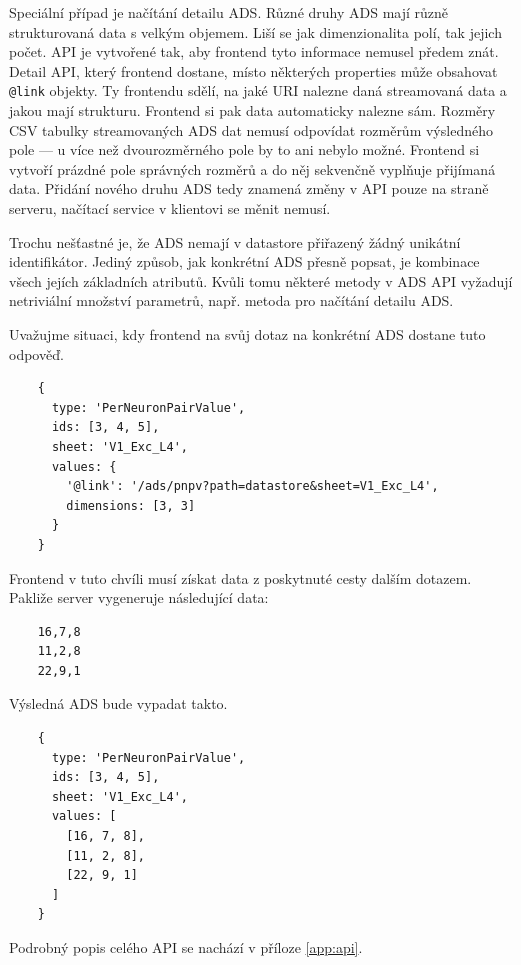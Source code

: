Speciální případ je načítání detailu ADS. Různé druhy ADS mají různě strukturovaná data s velkým objemem. Liší se jak dimenzionalita polí, tak jejich počet. API je vytvořené tak, aby frontend tyto informace nemusel předem znát. Detail API, který frontend dostane, místo některých properties může obsahovat \lstinline|@link| objekty. Ty frontendu sdělí, na jaké URI nalezne daná streamovaná data a jakou mají strukturu. Frontend si pak data automaticky nalezne sám. Rozměry CSV tabulky streamovaných ADS dat nemusí odpovídat rozměrům výsledného pole --- u více než dvourozměrného pole by to ani nebylo možné. Frontend si vytvoří prázdné pole správných rozměrů a do něj sekvenčně vyplňuje přijímaná data. Přidání nového druhu ADS tedy znamená změny v API pouze na straně serveru, načítací service v klientovi se měnit nemusí.

Trochu nešťastné je, že ADS nemají v datastore přiřazený žádný unikátní identifikátor. Jediný způsob, jak konkrétní ADS přesně popsat, je kombinace všech jejích základních atributů. Kvůli tomu některé metody v ADS API vyžadují netriviální množství parametrů, např. metoda pro načítání detailu ADS.

\begin{exmp}
  Uvažujme situaci, kdy frontend na svůj dotaz na konkrétní ADS dostane tuto odpověď.
  
  \begin{lstlisting}
    {
      type: 'PerNeuronPairValue',
      ids: [3, 4, 5],
      sheet: 'V1_Exc_L4',
      values: {
        '@link': '/ads/pnpv?path=datastore&sheet=V1_Exc_L4',
        dimensions: [3, 3]
      }
    }
  \end{lstlisting}
  
  Frontend v tuto chvíli musí získat data z poskytnuté cesty dalším dotazem. Pakliže server vygeneruje následující data:
  
  \begin{verbatim}
    16,7,8
    11,2,8
    22,9,1
  \end{verbatim}
  
  Výsledná ADS bude vypadat takto.
  
  \begin{lstlisting}
    {
      type: 'PerNeuronPairValue',
      ids: [3, 4, 5],
      sheet: 'V1_Exc_L4',
      values: [
        [16, 7, 8],
        [11, 2, 8],
        [22, 9, 1]
      ]
    }
  \end{lstlisting}
\end{exmp}

Podrobný popis celého API se nachází v příloze \ref{app:api}.


